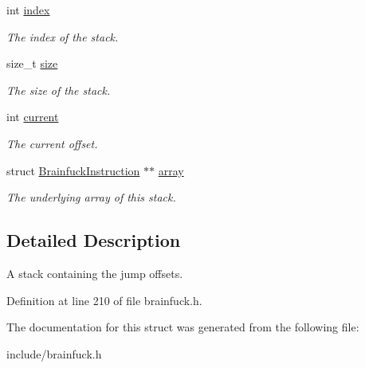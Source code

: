 \begin{DoxyCompactItemize}
\item 
\hypertarget{structBrainfuckParserContext_1_1BrainfuckOffsets_ac459ab8e26547c9a25755898e9f4d04f}{}int \hyperlink{structBrainfuckParserContext_1_1BrainfuckOffsets_ac459ab8e26547c9a25755898e9f4d04f}{index}\label{structBrainfuckParserContext_1_1BrainfuckOffsets_ac459ab8e26547c9a25755898e9f4d04f}

\begin{DoxyCompactList}\small\item\em The index of the stack. \end{DoxyCompactList}\item 
\hypertarget{structBrainfuckParserContext_1_1BrainfuckOffsets_a001387a6c7487348d1f508fab0993f0b}{}size\+\_\+t \hyperlink{structBrainfuckParserContext_1_1BrainfuckOffsets_a001387a6c7487348d1f508fab0993f0b}{size}\label{structBrainfuckParserContext_1_1BrainfuckOffsets_a001387a6c7487348d1f508fab0993f0b}

\begin{DoxyCompactList}\small\item\em The size of the stack. \end{DoxyCompactList}\item 
\hypertarget{structBrainfuckParserContext_1_1BrainfuckOffsets_a1cb35e2ff24dd361aa6c0ddf98664d6d}{}int \hyperlink{structBrainfuckParserContext_1_1BrainfuckOffsets_a1cb35e2ff24dd361aa6c0ddf98664d6d}{current}\label{structBrainfuckParserContext_1_1BrainfuckOffsets_a1cb35e2ff24dd361aa6c0ddf98664d6d}

\begin{DoxyCompactList}\small\item\em The current offset. \end{DoxyCompactList}\item 
\hypertarget{structBrainfuckParserContext_1_1BrainfuckOffsets_a2ce222a6b44c9992b827d4e7eb4b888e}{}struct \hyperlink{structBrainfuckInstruction}{Brainfuck\+Instruction} $\ast$$\ast$ \hyperlink{structBrainfuckParserContext_1_1BrainfuckOffsets_a2ce222a6b44c9992b827d4e7eb4b888e}{array}\label{structBrainfuckParserContext_1_1BrainfuckOffsets_a2ce222a6b44c9992b827d4e7eb4b888e}

\begin{DoxyCompactList}\small\item\em The underlying array of this stack. \end{DoxyCompactList}\end{DoxyCompactItemize}


\subsection{Detailed Description}
A stack containing the jump offsets. 

Definition at line 210 of file brainfuck.\+h.



The documentation for this struct was generated from the following file\+:\begin{DoxyCompactItemize}
\item 
include/brainfuck.\+h\end{DoxyCompactItemize}
